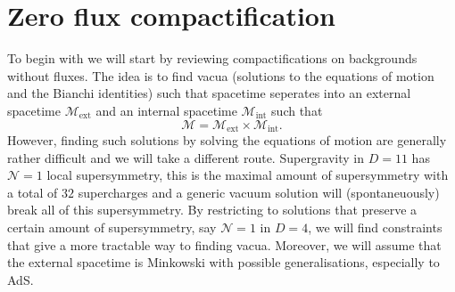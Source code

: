 

\section{Zero flux compactification\label{sec:VanishingFluxCompactification}}
To begin with we will start by reviewing compactifications on backgrounds without fluxes. The idea is to find vacua (solutions to the equations of motion and the Bianchi identities) such that spacetime seperates into an external spacetime $\mathcal{M}_{\text{ext}}$ and an internal spacetime $\mathcal{M}_{\text{int}}$ such that 
\begin{equation}
    \mathcal{M} = \mathcal{M}_{\text{ext}}\times \mathcal{M}_{\text{int}}.
\end{equation}
However, finding such solutions by solving the equations of motion are generally rather difficult and we will take a different route. Supergravity in $D=11$ has $\mathcal{N}=1$ local supersymmetry, this is the maximal amount of supersymmetry with a total of $32$ supercharges and a generic vacuum solution will (spontaneuously) break all of this supersymmetry. By restricting to solutions that preserve a certain amount of supersymmetry, say $\mathcal{N}=1$ in $D=4$, we will find constraints that give a more tractable way to finding vacua. Moreover, we will assume that the external spacetime is Minkowski with possible generalisations, especially to AdS. 

